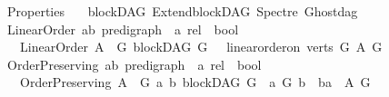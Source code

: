 %
\begin{isabellebody}%
%
%
\isadelimtheory
%
\endisadelimtheory
%
\isatagtheory
{}\isamarkupfalse%
\ Properties\isanewline
\ \ \ blockDAG\ ExtendblockDAG\ Spectre\ Ghostdag\isanewline
{}%
\endisatagtheory
{\isafoldtheory}%
%
\isadelimtheory
\isanewline
%
\endisadelimtheory
\isanewline
{}\isamarkupfalse%
\ Linear{\isacharunderscore}{\kern0pt}Order{\isacharcolon}{\kern0pt}{\isacharcolon}{\kern0pt}\ {\isachardoublequoteopen}{\isacharparenleft}{\kern0pt}{\isacharparenleft}{\kern0pt}{\isacharprime}{\kern0pt}a{\isacharcomma}{\kern0pt}{\isacharprime}{\kern0pt}b{\isacharparenright}{\kern0pt}\ pre{\isacharunderscore}{\kern0pt}digraph\ {\isasymRightarrow}\ {\isacharprime}{\kern0pt}a\ rel{\isacharparenright}{\kern0pt}\ {\isasymRightarrow}\ bool{\isachardoublequoteclose}\isanewline
\ \ \ {\isachardoublequoteopen}Linear{\isacharunderscore}{\kern0pt}Order\ A\ {\isasymequiv}\ {\isacharparenleft}{\kern0pt}{\isasymforall}G{\isachardot}{\kern0pt}\ blockDAG\ G\ \ {\isasymlongrightarrow}\ linear{\isacharunderscore}{\kern0pt}order{\isacharunderscore}{\kern0pt}on\ {\isacharparenleft}{\kern0pt}verts\ G{\isacharparenright}{\kern0pt}\ {\isacharparenleft}{\kern0pt}A\ G{\isacharparenright}{\kern0pt}{\isacharparenright}{\kern0pt}{\isachardoublequoteclose}\isanewline
\isanewline
\isanewline
{}\isamarkupfalse%
\ Order{\isacharunderscore}{\kern0pt}Preserving{\isacharcolon}{\kern0pt}{\isacharcolon}{\kern0pt}\ {\isachardoublequoteopen}{\isacharparenleft}{\kern0pt}{\isacharparenleft}{\kern0pt}{\isacharprime}{\kern0pt}a{\isacharcomma}{\kern0pt}{\isacharprime}{\kern0pt}b{\isacharparenright}{\kern0pt}\ pre{\isacharunderscore}{\kern0pt}digraph\ {\isasymRightarrow}\ {\isacharprime}{\kern0pt}a\ rel{\isacharparenright}{\kern0pt}\ {\isasymRightarrow}\ bool\ {\isachardoublequoteclose}\isanewline
\ \ \ {\isachardoublequoteopen}Order{\isacharunderscore}{\kern0pt}Preserving\ A\ {\isasymequiv}\ {\isacharparenleft}{\kern0pt}{\isasymforall}G\ a\ b{\isachardot}{\kern0pt}\ blockDAG\ G\ {\isasymlongrightarrow}\ a\ {\isasymrightarrow}\isactrlsup {\isacharplus}{\kern0pt}\isactrlbsub G\isactrlesub \ b\ {\isasymlongrightarrow}\ {\isacharparenleft}{\kern0pt}b{\isacharcomma}{\kern0pt}a{\isacharparenright}{\kern0pt}\ {\isasymin}\ {\isacharparenleft}{\kern0pt}A\ G{\isacharparenright}{\kern0pt}{\isacharparenright}{\kern0pt}{\isachardoublequoteclose}\isanewline
\isanewline
\isanewline
{}\isamarkupfalse%

\end{isabellebody}

